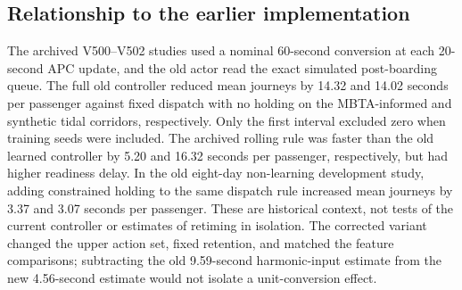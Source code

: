 \subsection{Relationship to the earlier implementation}
The archived V500--V502 studies used a nominal 60-second conversion at each 20-second APC update, and the old actor read the exact simulated post-boarding queue. The full old controller reduced mean journeys by 14.32 and 14.02 seconds per passenger against fixed dispatch with no holding on the MBTA-informed and synthetic tidal corridors, respectively. Only the first interval excluded zero when training seeds were included. The archived rolling rule was faster than the old learned controller by 5.20 and 16.32 seconds per passenger, respectively, but had higher readiness delay. In the old eight-day non-learning development study, adding constrained holding to the same dispatch rule increased mean journeys by 3.37 and 3.07 seconds per passenger. These are historical context, not tests of the current controller or estimates of retiming in isolation. The corrected variant changed the upper action set, fixed retention, and matched the feature comparisons; subtracting the old 9.59-second harmonic-input estimate from the new 4.56-second estimate would not isolate a unit-conversion effect.
